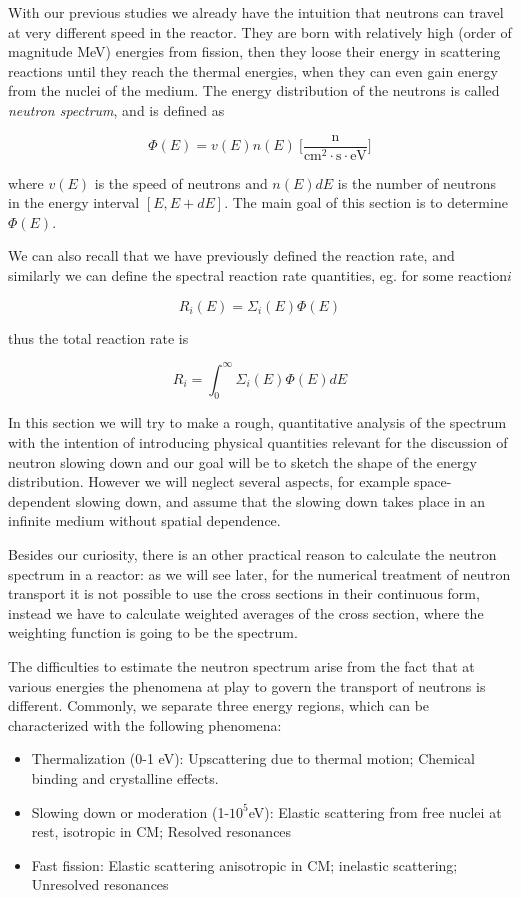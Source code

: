 With our previous studies we already have the intuition that neutrons can travel at very different speed in the reactor. They are born with relatively high (order of magnitude MeV) energies from fission, then they loose their energy in scattering reactions until they reach the thermal energies, when they can even gain energy from the nuclei of the medium. The energy distribution of the neutrons is called \textit{neutron spectrum}, and is defined as 

$$\Phi(E)=v(E)n(E) \: \Big[\frac{\text{n}}{\text{cm}^2\cdot\text{s}\cdot\text{eV}}\Big]$$

\noindent where $v(E)$ is the speed of neutrons and $n(E)dE$ is the number of neutrons in the energy interval $[E,E+dE]$. The main goal of this section is to determine $\Phi(E)$.

We can also recall that we have previously defined the reaction rate, and similarly we can define the spectral reaction rate quantities, eg. for some reaction$i$

$$R_i(E)=\Sigma_i(E)\Phi(E)$$

thus the total reaction rate is

$$R_i=\int_0^\infty\Sigma_i(E)\Phi(E)dE$$

In this section we will try to make a rough, quantitative analysis of the spectrum with the intention of introducing physical quantities relevant for the discussion of neutron slowing down and our goal will be to sketch the shape of the energy distribution. However we will neglect several aspects, for example space-dependent slowing down, and assume that the slowing down takes place in an infinite medium without spatial dependence.

Besides our curiosity, there is an other practical reason to calculate the neutron spectrum in a reactor: as we will see later, for the numerical treatment of neutron transport it is not possible to use the cross sections in their continuous form, instead we have to calculate weighted averages of the cross section, where the weighting function is going to be the spectrum. 

The difficulties to estimate the neutron spectrum arise from the fact that at various energies the phenomena at play to govern the transport of neutrons is different. Commonly, we separate three energy regions, which can be characterized with the following phenomena:

\begin{itemize}
\item Thermalization (0-1 eV): Upscattering due to thermal motion; Chemical binding and crystalline effects.
\item Slowing down or moderation (1-$10^5$eV): Elastic scattering from free nuclei at rest, isotropic in CM; Resolved resonances
\item Fast fission: Elastic scattering anisotropic in CM; inelastic scattering; Unresolved resonances
\end{itemize}

